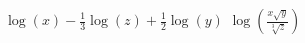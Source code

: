 {$\log(x) - \frac{1}{3} \log(z) + \frac{1}{2} \log(y)$}
{$\log\left(\frac{x \sqrt{y}}{\sqrt[3]{z}}  \right)$}


